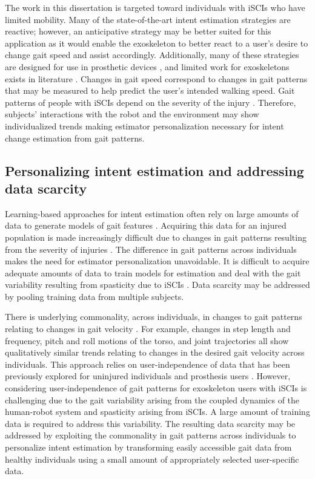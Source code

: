 The work in this dissertation is targeted toward individuals with iSCIs who have limited mobility. Many of the state-of-the-art intent estimation strategies are reactive; however, an anticipative strategy may be better suited for this application as it would enable the exoskeleton to better react to a user's desire to change gait speed and assist accordingly. Additionally, many of these strategies are designed for use in prosthetic devices \cite{young2013classifying,young2015classification,massalin2017user,thatte2019robust}, and limited work for exoskeletons exists in literature \cite{medrano2022analysis}. Changes in gait speed correspond to changes in gait patterns that may be measured to help predict the user's intended walking speed. Gait patterns of people with \mbox{iSCIs} depend on the severity of the injury \cite{rota2011walk}. Therefore, subjects' interactions with the robot and the environment may show individualized trends making estimator personalization necessary for intent change estimation from gait patterns. 

\subsection{Personalizing intent estimation and addressing data scarcity}\label{sec:personalization}

Learning-based approaches for intent estimation often rely on large amounts of data to generate models of gait features \cite{lee2020image,moolchandani2021design}. Acquiring this data for an injured population is made increasingly difficult due to changes in gait patterns resulting from the severity of injuries \cite{sohn2018variability}. The difference in gait patterns across individuals makes the need for estimator personalization unavoidable. It is difficult to acquire adequate amounts of data to train models for estimation and deal with the gait variability resulting from spasticity due to iSCIs \cite{krawetz1996gait}. Data scarcity may be addressed by pooling training data from multiple subjects.

There is underlying commonality, across individuals, in changes to gait patterns relating to changes in gait velocity \cite{li1999coordination}. For example, changes in step length and frequency, pitch and roll motions of the torso, and joint trajectories all show qualitatively similar trends relating to changes in the desired gait velocity across individuals. This approach relies on user-independence of data that has been previously explored for uninjured individuals \cite{ibrahim2008gait, kilmartin2009optimising, wang2008accelerometry} and prosthesis users \cite{young2015classification}. However, considering user-independence of gait patterns for exoskeleton users with iSCIs is challenging due to the gait variability arising from the coupled dynamics of the human-robot system and spasticity arising from \mbox{iSCIs}. A large amount of training data is required to address this variability. The resulting data scarcity may be addressed by exploiting the commonality in gait patterns across individuals to personalize intent estimation by transforming easily accessible gait data from healthy individuals using a small amount of appropriately selected user-specific data.

